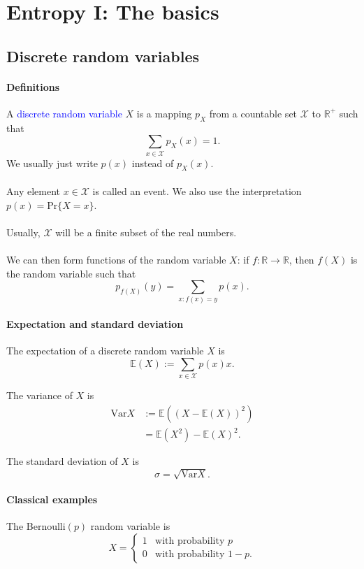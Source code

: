 \documentclass[a4paper, 11pt, openany]{book}
\numberwithin{equation}{section}
\theoremstyle{plain}
\theoremstyle{definition}
\newcommand{\expectation}{\mathbb{E}}
\newcommand{\Structure}[1]{\textcolor{blue}{#1}}
\newcommand{\alphabet}[1]{\mathcal{#1}}
\begin{document}
\section{Entropy I: The basics}
\label{sec:31}



\subsection{Discrete random variables}

\paragraph{Definitions}
A \Structure{discrete random variable} $X$ is a mapping $p_X$ from a countable set $\alphabet{X}$ to $\mathbb{R}^+$ such that
$$
	\sum_{x \in \alphabet{X}} p_X(x) = 1.
$$
We usually just write $p(x)$ instead of $p_X(x)$.\\
~\\
Any element $x \in \alphabet{X}$ is called an event. We also use the interpretation $p(x) = \mathrm{Pr}\{X = x\}$.\\
~\\
Usually, $\alphabet{X}$ will be a finite subset of the real numbers.\\
~\\
We can then form functions of the random variable $X$: if $f: \mathbb{R} \to \mathbb{R}$, then $f(X)$ is the random variable such that
$$
	p_{f(X)}(y) = \sum_{x : f(x) = y} p(x).
$$


\paragraph{Expectation and standard deviation}
The expectation of a discrete random variable $X$ is
$$
	\expectation (X) := \sum_{x \in \alphabet{X}} p(x) x.
$$

The variance of $X$ is
\begin{align*}
	\mathrm{Var} X 	&:= \expectation( (X - \expectation(X) )^2)\\
					&=\expectation (X^2) - \expectation (X)^2.
\end{align*}

The standard deviation of $X$ is
$$
	\sigma =\sqrt{\mathrm{Var} X}.
$$



\paragraph{Classical examples}
The Bernoulli$(p)$ random variable is
$$
	X = \begin{cases}
		1 &\text{with probability } p\\
		0 &\text{with probability } 1-p.
		\end{cases}
$$
\end{document}

